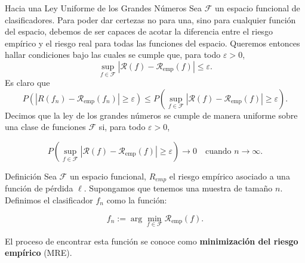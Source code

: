 \documentclass[aspectratio=169, 10pt]{beamer}
\begin{document}
\begin{frame}{Hacia una Ley Uniforme de los Grandes Números}
  Sea $\mathcal{F}$ un espacio funcional de clasificadores. Para poder dar certezas no para una, sino
  para cualquier función del espacio, debemos de ser capaces de acotar la diferencia entre el riesgo empírico y el riesgo real
  para todas las funciones del espacio. Queremos entonces hallar condiciones bajo las cuales se cumple que, para todo $\varepsilon > 0$,
\[
\sup_{f \in \mathcal{F}} |\mathcal{R}(f) - \mathcal{R}_{\text{emp}}(f)| \leq \varepsilon.
\]
\pause
Es claro que
\begin{equation*}
P(|R(f_n) - \mathcal{R}_{\text{emp}}(f_n)| \geq \varepsilon) \leq P\left(\sup_{f \in \mathcal{F}} |\mathcal{R}(f) - \mathcal{R}_{\text{emp}}(f)| \geq \varepsilon\right).
\end{equation*}
\pause
Decimos que la ley de los grandes números se cumple de manera uniforme sobre una clase de funciones \(\mathcal{F}\) si,
para todo \(\varepsilon > 0\),

\[
P\left(\sup_{f \in \mathcal{F}} |\mathcal{R}(f) - \mathcal{R}_{\text{emp}}(f)| \geq \varepsilon \right) \to 0 \quad \text{cuando } n \to \infty.
\]

\end{frame}

\begin{frame}
  \begin{block}{Definición}
    \Large
    Sea $\mathcal{F}$ un espacio funcional, $R_{emp}$ el riesgo empírico asociado a una
    función de pérdida $\ell$. Supongamos que tenemos una muestra de tamaño $n$. Definimos el clasificador \(f_n\) como la función:

\[
f_n := \arg\min_{f \in \mathcal{F}} \mathcal{R}_{\text{emp}}(f).
\]
  \end{block}

\pause
\bigskip

\pause
\bigskip
El proceso de encontrar esta función se conoce como \textbf{minimización del riesgo empírico} (MRE).
\pause
\bigskip


\end{frame}
\end{document}
